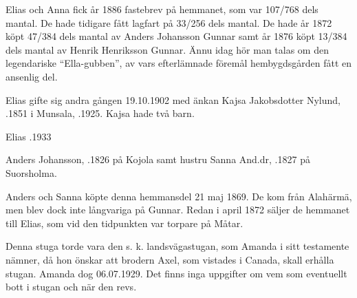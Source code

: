 Elias och Anna fick år 1886 fastebrev på hemmanet, som var 107/768 dels mantal. De hade tidigare fått lagfart på 33/256 dels mantal. De hade år 1872 köpt 47/384 dels mantal av Anders Johansson Gunnar samt år 1876 köpt 13/384 dels mantal av Henrik Henriksson Gunnar. Ännu idag hör man talas om den legendariske ``Ella-gubben'', av vars efterlämnade föremål hembygdsgården fått en ansenlig del.

Elias gifte sig andra gången 19.10.1902 med änkan Kajsa Jakobsdotter Nylund, .1851 i Munsala, .1925. Kajsa hade två barn.
\begin{jhchildren}
  \item {}
  \item {}
\end{jhchildren}

Elias .1933


Anders Johansson, .1826 på Kojola samt hustru Sanna And.dr, .1827 på Suorsholma.
\begin{jhchildren}
  \item {}
  \item {}
  \item {}
\end{jhchildren}

Anders och Sanna köpte denna hemmansdel 21 maj 1869. De kom från Alahärmä, men blev dock inte långvariga på Gunnar. Redan i april 1872 säljer de hemmanet till Elias, som vid den tidpunkten var torpare på Måtar.





Denna stuga torde vara den s. k. landsvägastugan, som Amanda i sitt testamente nämner, då hon önskar att brodern Axel, som vistades i Canada, skall erhålla stugan. Amanda dog 06.07.1929. Det finns inga uppgifter om vem som eventuellt bott i stugan och när den revs.


